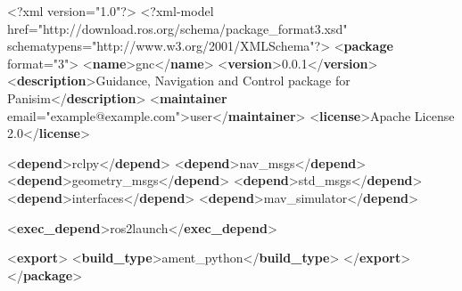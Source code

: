 \documentclass[
  letterpaper,
  DIV=11,
  numbers=noendperiod]{scrreprt}
\newenvironment{Shaded}{\begin{snugshade}}{\end{snugshade}}
\newcommand{\FunctionTok}[1]{\textcolor[rgb]{0.28,0.35,0.67}{#1}}
\newcommand{\KeywordTok}[1]{\textcolor[rgb]{0.00,0.23,0.31}{\textbf{#1}}}
\newcommand{\NormalTok}[1]{\textcolor[rgb]{0.00,0.23,0.31}{#1}}
\newcommand{\OtherTok}[1]{\textcolor[rgb]{0.00,0.23,0.31}{#1}}
\newcommand{\StringTok}[1]{\textcolor[rgb]{0.13,0.47,0.30}{#1}}
\begin{document}
\begin{Shaded}
\begin{Highlighting}[]
\FunctionTok{\textless{}?xml}\OtherTok{ version=}\StringTok{"1.0"}\FunctionTok{?\textgreater{}}
\FunctionTok{\textless{}?xml{-}model}\NormalTok{ href="http://download.ros.org/schema/package\_format3.xsd" schematypens="http://www.w3.org/2001/XMLSchema"}\FunctionTok{?\textgreater{}}
\NormalTok{\textless{}}\KeywordTok{package}\OtherTok{ format=}\StringTok{"3"}\NormalTok{\textgreater{}}
\NormalTok{  \textless{}}\KeywordTok{name}\NormalTok{\textgreater{}gnc\textless{}/}\KeywordTok{name}\NormalTok{\textgreater{}}
\NormalTok{  \textless{}}\KeywordTok{version}\NormalTok{\textgreater{}0.0.1\textless{}/}\KeywordTok{version}\NormalTok{\textgreater{}}
\NormalTok{  \textless{}}\KeywordTok{description}\NormalTok{\textgreater{}Guidance, Navigation and Control package for Panisim\textless{}/}\KeywordTok{description}\NormalTok{\textgreater{}}
\NormalTok{  \textless{}}\KeywordTok{maintainer}\OtherTok{ email=}\StringTok{"example@example.com"}\NormalTok{\textgreater{}user\textless{}/}\KeywordTok{maintainer}\NormalTok{\textgreater{}}
\NormalTok{  \textless{}}\KeywordTok{license}\NormalTok{\textgreater{}Apache License 2.0\textless{}/}\KeywordTok{license}\NormalTok{\textgreater{}}

\NormalTok{  \textless{}}\KeywordTok{depend}\NormalTok{\textgreater{}rclpy\textless{}/}\KeywordTok{depend}\NormalTok{\textgreater{}}
\NormalTok{  \textless{}}\KeywordTok{depend}\NormalTok{\textgreater{}nav\_msgs\textless{}/}\KeywordTok{depend}\NormalTok{\textgreater{}}
\NormalTok{  \textless{}}\KeywordTok{depend}\NormalTok{\textgreater{}geometry\_msgs\textless{}/}\KeywordTok{depend}\NormalTok{\textgreater{}}
\NormalTok{  \textless{}}\KeywordTok{depend}\NormalTok{\textgreater{}std\_msgs\textless{}/}\KeywordTok{depend}\NormalTok{\textgreater{}}
\NormalTok{  \textless{}}\KeywordTok{depend}\NormalTok{\textgreater{}interfaces\textless{}/}\KeywordTok{depend}\NormalTok{\textgreater{}}
\NormalTok{  \textless{}}\KeywordTok{depend}\NormalTok{\textgreater{}mav\_simulator\textless{}/}\KeywordTok{depend}\NormalTok{\textgreater{}}
  
\NormalTok{  \textless{}}\KeywordTok{exec\_depend}\NormalTok{\textgreater{}ros2launch\textless{}/}\KeywordTok{exec\_depend}\NormalTok{\textgreater{}}

\NormalTok{  \textless{}}\KeywordTok{export}\NormalTok{\textgreater{}}
\NormalTok{    \textless{}}\KeywordTok{build\_type}\NormalTok{\textgreater{}ament\_python\textless{}/}\KeywordTok{build\_type}\NormalTok{\textgreater{}}
\NormalTok{  \textless{}/}\KeywordTok{export}\NormalTok{\textgreater{}}
\NormalTok{\textless{}/}\KeywordTok{package}\NormalTok{\textgreater{}}
\end{Highlighting}
\end{Shaded}
\end{document}
